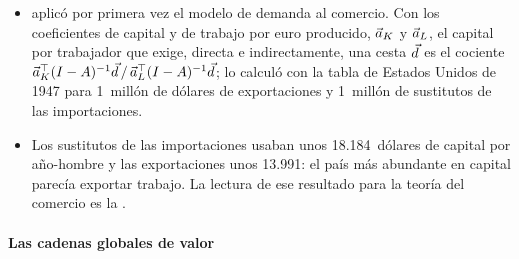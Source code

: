 \documentclass[11pt]{article}
\begin{document}
\begin{itemize}
\item \textcite{Leontief1953Domestic} aplicó por primera vez el modelo de demanda al comercio. Con los coeficientes de capital y de trabajo por euro producido, $\vec{a}_K$ y $\vec{a}_L$, el capital por trabajador que exige, directa e indirectamente, una cesta $\vec{d}$ es el cociente $\vec{a}_K^{\top}(I-A)^{-1}\vec{d}\,/\,\vec{a}_L^{\top}(I-A)^{-1}\vec{d}$; lo calculó con la tabla de Estados Unidos de 1947 para 1~millón de dólares de exportaciones y 1~millón de sustitutos de las importaciones.
\item Los sustitutos de las importaciones usaban unos 18.184~dólares de capital por año-hombre y las exportaciones unos 13.991: el país más abundante en capital parecía exportar trabajo. La lectura de ese resultado para la teoría del comercio es la  .
\end{itemize}

\paragraph{Las cadenas globales de valor}
\end{document}
